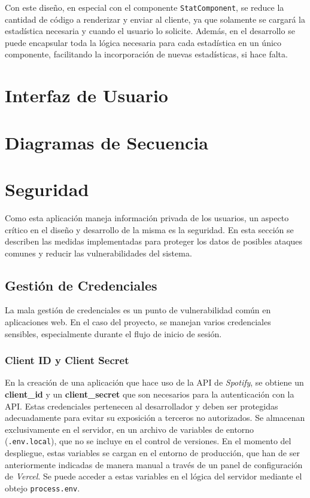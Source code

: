 Con este diseño, en especial con el componente \texttt{StatComponent}, se reduce la cantidad de código a renderizar y enviar al cliente, ya que solamente se cargará la estadística necesaria y cuando el usuario lo solicite. Además, en el desarrollo se puede encapsular toda la lógica necesaria para cada estadística en un único componente, facilitando la incorporación de nuevas estadísticas, si hace falta.




\section{Interfaz de Usuario}

\section{Diagramas de Secuencia}




\section{Seguridad}

Como esta aplicación maneja información privada de los usuarios, un aspecto crítico en el diseño y desarrollo de la misma es la seguridad. En esta sección se describen las medidas implementadas para proteger los datos de posibles ataques comunes y reducir las vulnerabilidades del sistema.

\subsection{Gestión de Credenciales}

La mala gestión de credenciales es un punto de vulnerabilidad común en aplicaciones web. En el caso del proyecto, se manejan varios credenciales sensibles, especialmente durante el flujo de inicio de sesión.

\subsubsection*{Client ID y Client Secret}

En la creación de una aplicación que hace uso de la API de \textit{Spotify}, se obtiene un \textbf{client\_id} y un \textbf{client\_secret} que son necesarios para la autenticación con la API. Estas credenciales pertenecen al desarrollador y deben ser protegidas adecuadamente para evitar su exposición a terceros no autorizados. Se almacenan exclusivamente en el servidor, en un archivo de variables de entorno (\texttt{.env.local}), que no se incluye en el control de versiones. En el momento del despliegue, estas variables se cargan en el entorno de producción, que han de ser anteriormente indicadas de manera manual a través de un panel de configuración de \textit{Vercel}. Se puede acceder a estas variables en el lógica del servidor mediante el obtejo \texttt{process.env}.


